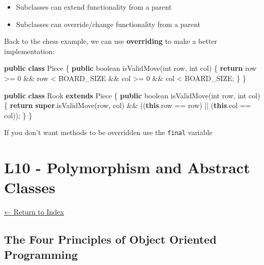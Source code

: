 \documentclass[]{article}
\newenvironment{Shaded}{}{}
\newcommand{\DataTypeTok}[1]{\textcolor[rgb]{0.56,0.13,0.00}{#1}}
\newcommand{\DecValTok}[1]{\textcolor[rgb]{0.25,0.63,0.44}{#1}}
\newcommand{\FunctionTok}[1]{\textcolor[rgb]{0.02,0.16,0.49}{#1}}
\newcommand{\KeywordTok}[1]{\textcolor[rgb]{0.00,0.44,0.13}{\textbf{#1}}}
\newcommand{\NormalTok}[1]{#1}
\providecommand{\tightlist}{%
  \setlength{\itemsep}{0pt}\setlength{\parskip}{0pt}}
\begin{document}
\begin{itemize}
\tightlist
\item
  Subclasses can extend functionality from a parent
\item
  Subclasses can override/change functionality from a parent
\end{itemize}

Back to the chess example, we can use \textbf{overriding} to make a
better implementation:

\begin{Shaded}
\begin{Highlighting}[]
\KeywordTok{public} \KeywordTok{class}\NormalTok{ Piece \{}
    \KeywordTok{public} \DataTypeTok{boolean} \FunctionTok{isValidMove}\NormalTok{(}\DataTypeTok{int}\NormalTok{ row, }\DataTypeTok{int}\NormalTok{ col) \{}
        \KeywordTok{return}\NormalTok{ row >= }\DecValTok{0}\NormalTok{ && row < BOARD_SIZE &&}
\NormalTok{        col >= }\DecValTok{0}\NormalTok{ && col < BOARD_SIZE;}
\NormalTok{    \}}
\NormalTok{\}}
\end{Highlighting}
\end{Shaded}

\begin{Shaded}
\begin{Highlighting}[]
\KeywordTok{public} \KeywordTok{class}\NormalTok{ Rook }\KeywordTok{extends}\NormalTok{ Piece \{}
    \KeywordTok{public} \DataTypeTok{boolean} \FunctionTok{isValidMove}\NormalTok{(}\DataTypeTok{int}\NormalTok{ row, }\DataTypeTok{int}\NormalTok{ col) \{}
        \KeywordTok{return} \KeywordTok{super}\NormalTok{.}\FunctionTok{isValidMove}\NormalTok{(row, col) && ((}\KeywordTok{this}\NormalTok{.}\FunctionTok{row}\NormalTok{ == row) || (}\KeywordTok{this}\NormalTok{.}\FunctionTok{col}\NormalTok{ == col));}
\NormalTok{    \}}
\NormalTok{\}}
\end{Highlighting}
\end{Shaded}

If you don't want methods to be overridden use the \texttt{final}
variable

\hypertarget{l10---polymorphism-and-abstract-classes}{%
\section{L10 - Polymorphism and Abstract
Classes}\label{l10---polymorphism-and-abstract-classes}}

\protect\hyperlink{table-of-contents}{← Return to Index}

\hypertarget{the-four-principles-of-object-oriented-programming}{%
\subsection{The Four Principles of Object Oriented
Programming}\label{the-four-principles-of-object-oriented-programming}}
\end{document}
